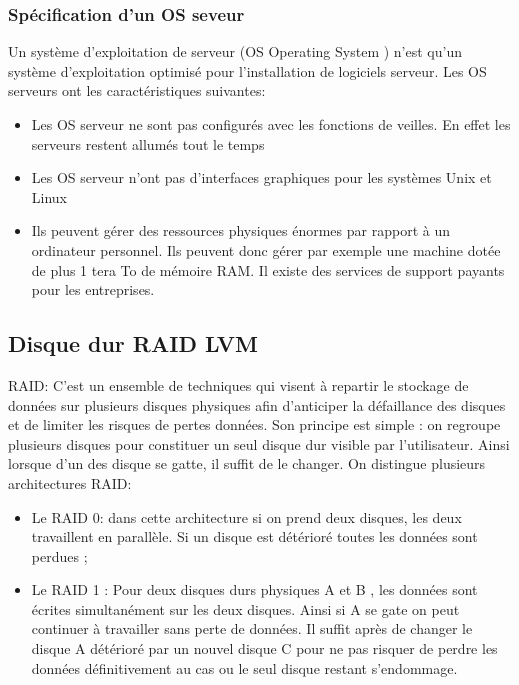 \documentclass[a4paper,12pt,french]{report} %
\begin{document}
\subsubsection{Spécification d'un OS seveur}
	Un système d'exploitation de serveur (OS Operating System ) n'est qu'un système d'exploitation optimisé pour l'installation de logiciels serveur. Les OS serveurs ont les caractéristiques suivantes:
\begin{itemize}
	\item Les OS serveur ne sont pas configurés avec les fonctions de veilles. En effet les serveurs restent allumés tout le temps
	\item Les OS serveur n'ont pas d'interfaces graphiques pour les systèmes Unix et Linux
	\item Ils peuvent gérer des ressources physiques énormes par rapport à un ordinateur personnel. Ils peuvent donc gérer par exemple une machine dotée de plus 1 tera To de mémoire RAM. Il existe des services de support payants pour les entreprises.
\end{itemize} 
	
\subsection{Disque dur RAID LVM}
RAID: C'est un ensemble de techniques qui visent à repartir le stockage de données sur plusieurs disques physiques afin d'anticiper la défaillance des disques et de limiter les risques de pertes données. Son principe est simple : on regroupe plusieurs disques pour constituer un seul disque dur visible par l'utilisateur. Ainsi lorsque d'un des disque se gatte, il suffit de le changer. On distingue plusieurs architectures RAID\label{ref:eneam}:
\begin{itemize}
	\item Le RAID 0: dans cette architecture si on prend deux disques, les deux travaillent en parallèle. Si un disque est détérioré toutes les données sont perdues ;
	\item Le RAID 1 : Pour deux disques durs physiques A et B , les données sont écrites simultanément sur les deux disques. Ainsi si A se gate on peut continuer à travailler sans perte de données. Il suffit après de changer le disque A détérioré par un nouvel disque C pour ne pas risquer de perdre les données définitivement  au cas ou le seul disque restant s'endommage.
\end{itemize}
\end{document}
